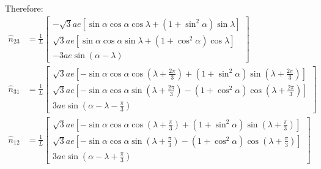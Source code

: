 \documentclass{article}
\begin{document}
	Therefore:
	\begin{align}
		\hat{n}_{23} &= \frac{1}{L}
		\begin{bmatrix}
			-\sqrt{3}a e\left[\sin\alpha\cos\alpha\cos\lambda + (1 + \sin^2\alpha)\sin\lambda\right] \\
			\sqrt{3} a e \left[ \sin \alpha \cos \alpha \sin \lambda + (1 + \cos^2 \alpha) \cos \lambda \right] \\
			-3 a e \sin(\alpha - \lambda)
		\end{bmatrix} \\
		\hat{n}_{31} &= \frac{1}{L}
		\begin{bmatrix}
			\sqrt{3}a e\left[-\sin\alpha\cos\alpha\cos\left(\lambda + \frac{2\pi}{3}\right) + (1 + \sin^2\alpha)\sin\left(\lambda + \frac{2\pi}{3}\right)\right] \\
			\sqrt{3}a e\left[-\sin\alpha\cos\alpha\sin\left(\lambda + \frac{2\pi}{3}\right) - (1 + \cos^2\alpha)\cos\left(\lambda + \frac{2\pi}{3}\right)\right] \\
			3a e\sin\left(\alpha - \lambda - \frac{\pi}{3}\right)
		\end{bmatrix} \\
		\hat{n}_{12} &= \frac{1}{L}
		\begin{bmatrix}
			\sqrt{3}a e\left[-\sin\alpha\cos\alpha\cos\left(\lambda + \frac{\pi}{3}\right) + (1 + \sin^2\alpha)\sin\left(\lambda + \frac{\pi}{3}\right)\right] \\
			\sqrt{3}a e\left[-\sin\alpha\cos\alpha\sin\left(\lambda + \frac{\pi}{3}\right) - (1 + \cos^2\alpha)\cos\left(\lambda + \frac{\pi}{3}\right)\right] \\
			3a e\sin\left(\alpha - \lambda + \frac{\pi}{3}\right)
		\end{bmatrix}
	\end{align}
	
\end{document}
